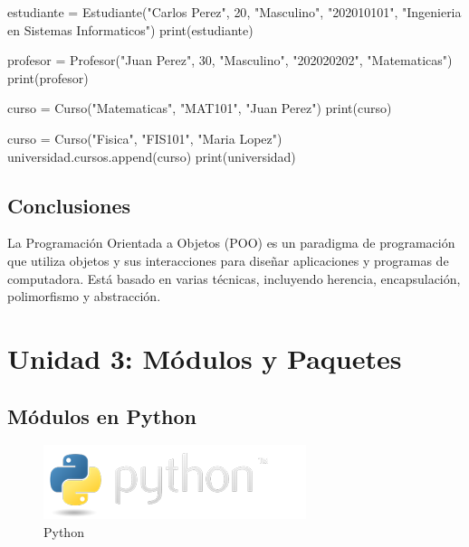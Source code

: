 \documentclass[
  a4paper,
  DIV=11,
  numbers=noendperiod,
  onepage,
  openany]{scrreprt}
\newenvironment{Shaded}{\begin{snugshade}}{\end{snugshade}}
\newcommand{\BuiltInTok}[1]{\textcolor[rgb]{0.00,0.23,0.31}{#1}}
\newcommand{\DecValTok}[1]{\textcolor[rgb]{0.68,0.00,0.00}{#1}}
\newcommand{\NormalTok}[1]{\textcolor[rgb]{0.00,0.23,0.31}{#1}}
\newcommand{\OperatorTok}[1]{\textcolor[rgb]{0.37,0.37,0.37}{#1}}
\newcommand{\StringTok}[1]{\textcolor[rgb]{0.13,0.47,0.30}{#1}}
\begin{document}
\begin{Shaded}
\begin{Highlighting}[]
\NormalTok{estudiante }\OperatorTok{=}\NormalTok{ Estudiante(}\StringTok{"Carlos Perez"}\NormalTok{, }\DecValTok{20}\NormalTok{, }\StringTok{"Masculino"}\NormalTok{, }\StringTok{"202010101"}\NormalTok{, }\StringTok{"Ingenieria en Sistemas Informaticos"}\NormalTok{)}
\BuiltInTok{print}\NormalTok{(estudiante)}

\NormalTok{profesor }\OperatorTok{=}\NormalTok{ Profesor(}\StringTok{"Juan Perez"}\NormalTok{, }\DecValTok{30}\NormalTok{, }\StringTok{"Masculino"}\NormalTok{, }\StringTok{"202020202"}\NormalTok{, }\StringTok{"Matematicas"}\NormalTok{)}
\BuiltInTok{print}\NormalTok{(profesor)}

\NormalTok{curso }\OperatorTok{=}\NormalTok{ Curso(}\StringTok{"Matematicas"}\NormalTok{, }\StringTok{"MAT101"}\NormalTok{, }\StringTok{"Juan Perez"}\NormalTok{)}
\BuiltInTok{print}\NormalTok{(curso)}

\NormalTok{curso }\OperatorTok{=}\NormalTok{ Curso(}\StringTok{"Fisica"}\NormalTok{, }\StringTok{"FIS101"}\NormalTok{, }\StringTok{"Maria Lopez"}\NormalTok{)}
\NormalTok{universidad.cursos.append(curso)}
\BuiltInTok{print}\NormalTok{(universidad)}
\end{Highlighting}
\end{Shaded}

\chapter{Conclusiones}\label{conclusiones-4}

La Programación Orientada a Objetos (POO) es un paradigma de
programación que utiliza objetos y sus interacciones para diseñar
aplicaciones y programas de computadora. Está basado en varias técnicas,
incluyendo herencia, encapsulación, polimorfismo y abstracción.

\part{Unidad 3: Módulos y Paquetes}

\chapter{Módulos en Python}\label{muxf3dulos-en-python}

\begin{figure}[H]

{\centering \includegraphics{index_files/mediabag/python-logo.png}

}

\caption{Python}

\end{figure}%
\end{document}
